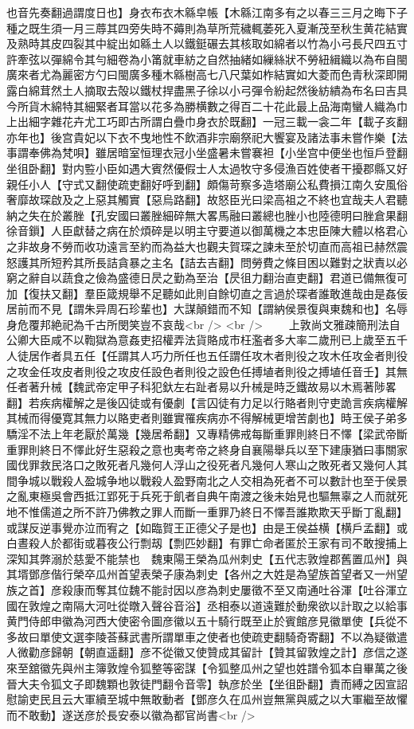 也音先奏翻過謂度日也】身衣布衣木緜皁帳【木緜江南多有之以春三三月之晦下子種之既生須一月三蓐其四旁失時不薅則為草所荒穢輒萎死入夏漸茂至秋生黄花結實及熟時其皮四裂其中綻出如緜土人以鐵鋌碾去其核取如綿者以竹為小弓長尺四五寸許牽弦以彈綿令其勻細卷為小筩就車紡之自然抽緒如繅絲狀不勞紐緝織以為布自閩廣來者尤為麗密方勺曰閩廣多種木緜樹高七八尺葉如柞結實如大菱而色青秋深即開露白綿茸然土人摘取去殻以鐵杖捍盡黑子徐以小弓彈令紛起然後紡繢為布名曰吉具今所貨木綿特其細緊者耳當以花多為勝横數之得百二十花此最上品海南蠻人織為巾上出細字雜花卉尤工巧即古所謂白疊巾身衣於既翻】一冠三載一衾二年【載子亥翻亦年也】後宫貴妃以下衣不曳地性不飲酒非宗廟祭祀大饗宴及諸法事未嘗作樂【法事謂奉佛為梵唄】雖居暗室恒理衣冠小坐盛暑未嘗褰袒【小坐宫中便坐也恒戶登翻坐徂卧翻】對内䜿小臣如遇大賓然優假士人太過牧守多侵漁百姓使者干擾郡縣又好親任小人【守式又翻使疏吏翻好呼到翻】頗傷苛察多造塔廟公私費損江南久安風俗奢靡故琛啟及之上惡其觸實【惡烏路翻】故怒臣光曰梁高祖之不終也宜哉夫人君聽納之失在於叢脞【孔安國曰叢脞細碎無大畧馬融曰叢總也脞小也陸德明曰脞倉果翻徐音鎻】人臣獻替之病在於煩碎是以明主守要道以御萬機之本忠臣陳大體以格君心之非故身不勞而收功遠言至約而為益大也觀夫賀琛之諫未至於切直而高祖已赫然震怒護其所短矜其所長詰貪暴之主名【詰去吉翻】問勞費之條目困以難對之狀責以必窮之辭自以蔬食之儉為盛德日昃之勤為至治【昃徂力翻治直吏翻】君道已備無復可加【復扶又翻】羣臣箴規舉不足聽如此則自餘切直之言過於琛者誰敢進哉由是姦佞居前而不見【謂朱异周石珍輩也】大謀顛錯而不知【謂納侯景復與東魏和也】名辱身危覆邦絶祀為千古所閔笑豈不哀哉<br />
<br />
　　上敦尚文雅疎簡刑法自公卿大臣咸不以鞫獄為意姦吏招權弄法貨賂成市枉濫者多大率二歲刑已上歲至五千人徒居作者具五任【任謂其人巧力所任也五任謂任攻木者則役之攻木任攻金者則役之攻金任攻皮者則役之攻皮任設色者則役之設色任搏埴者則役之搏埴任音壬】其無任者著升械【魏武帝定甲子科犯釱左右趾者易以升械是時乏鐵故易以木焉著陟畧翻】若疾病權解之是後囚徒或有優劇【言囚徒有力足以行賂者則守吏詭言疾病權解其械而得優寛其無力以賂吏者則雖實罹疾病亦不得解械更增苦劇也】時王侯子弟多驕淫不法上年老厭於萬幾【幾居希翻】又專精佛戒每斷重罪則終日不懌【梁武帝斷重罪則終日不懌此好生惡殺之意也夷考帝之終身自襄陽舉兵以至下建康猶曰事關家國伐罪救民洛口之敗死者凡幾何人浮山之役死者凡幾何人寒山之敗死者又幾何人其間争城以戰殺人盈城争地以戰殺人盈野南北之人交相為死者不可以數計也至于侯景之亂東極吳會西抵江郢死于兵死于飢者自典午南渡之後未始見也驅無辜之人而就死地不惟儒道之所不許乃佛教之罪人而斷一重罪乃終日不懌吾誰欺欺天乎斷丁亂翻】或謀反逆事覺亦泣而宥之【如臨賀王正德父子是也】由是王侯益横【横戶孟翻】或白晝殺人於都街或暮夜公行剽刼【剽匹妙翻】有罪亡命者匿於王家有司不敢搜捕上深知其弊溺於慈愛不能禁也　魏東陽王榮為瓜州刺史【五代志敦煌郡舊置瓜州】與其壻鄧彦偕行榮卒瓜州首望表榮子康為刺史【各州之大姓是為望族首望者又一州望族之首】彦殺康而奪其位魏不能討因以彦為刺史屢徵不至又南通吐谷渾【吐谷渾立國在敦煌之南隔大河吐從暾入聲谷音浴】丞相泰以道遠難於動衆欲以計取之以給事黄門侍郎申徽為河西大使密令圖彦徽以五十騎行既至止於賓館彦見徽單使【兵從不多故曰單使文選李陵荅蘇武書所謂單車之使者也使疏吏翻騎奇寄翻】不以為疑徽遣人微勸彦歸朝【朝直遥翻】彦不從徽又使贊成其留計【贊其留敦煌之計】彦信之遂來至舘徽先與州主簿敦煌令狐整等密謀【令狐整瓜州之望也姓譜令狐本自畢萬之後晉大夫令狐文子即魏顆也敦徒門翻令音零】執彦於坐【坐徂卧翻】責而縛之因宣詔慰諭吏民且云大軍續至城中無敢動者【鄧彦久在瓜州豈無黨與威之以大軍繼至故懼而不敢動】遂送彦於長安泰以徽為都官尚書<br />
